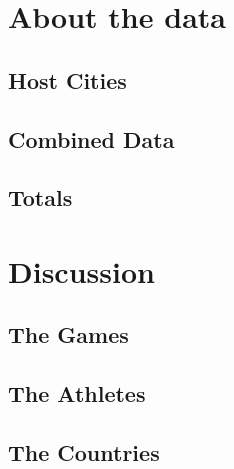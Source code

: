 \documentclass[a4 paper, 12pt]{article}
\begin{document}
\pagebreak
{}
%
%









\pagebreak
\appendix
\appendixpage
\addappheadtotoc
\section{About the data}

    \subsection{Host Cities}
    

    \pagebreak
    \subsection{Combined Data}
    

    \pagebreak
    \subsection{Totals}
    


\pagebreak
\section{Discussion}
    \subsection{The Games}
    

    \pagebreak
    \subsection{The Athletes}
    

    \pagebreak
    \subsection{The Countries}
    
\end{document}
